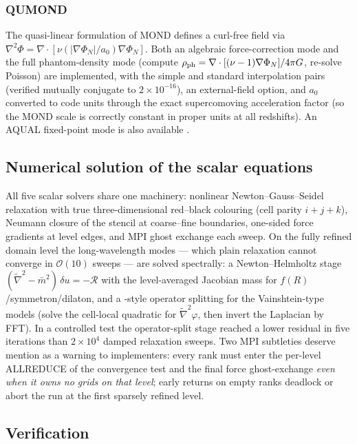 \documentclass[11pt,a4paper]{article}
\begin{document}
\subsubsection{QUMOND}
The quasi-linear formulation of MOND \citep{Milgrom2010} defines a
curl-free field via
$\nabla^2\Phi=\nabla\cdot[\nu(|\nabla\Phi_N|/a_0)\nabla\Phi_N]$.
Both an algebraic force-correction mode and the full
phantom-density mode (compute $\rho_{\rm ph}=\nabla\cdot[(\nu-1)
\nabla\Phi_N]/4\pi G$, re-solve Poisson) are implemented, with the
simple and standard interpolation pairs (verified mutually
conjugate to $2\times10^{-16}$), an external-field option, and
$a_0$ converted to code units through the exact supercomoving
acceleration factor (so the MOND scale is correctly constant in
proper units at all redshifts). An AQUAL fixed-point mode is also
available \citep[cf.][]{Lughausen2015,Candlish2015}.

\subsection{Numerical solution of the scalar equations}
\label{sec:solver}

All five scalar solvers share one machinery: nonlinear
Newton--Gauss--Seidel relaxation with true three-dimensional
red--black colouring (cell parity $i{+}j{+}k$), Neumann closure of
the stencil at coarse--fine boundaries, one-sided force gradients
at level edges, and MPI ghost exchange each sweep. On the fully
refined domain level the long-wavelength modes --- which plain
relaxation cannot converge in $\mathcal{O}(10)$ sweeps --- are
solved spectrally: a Newton--Helmholtz stage
$(\tilde\nabla^2-\bar m^2)\,\delta u=-\mathcal{R}$ with the
level-averaged Jacobian mass for $f(R)$/symmetron/dilaton, and a
\citet{Winther2015}-style operator splitting for the
Vainshtein-type models (solve the cell-local quadratic for
$\tilde\nabla^2\varphi$, then invert the Laplacian by FFT). In a
controlled test the operator-split stage reached a lower residual
in five iterations than $2\times10^4$ damped relaxation sweeps.
Two MPI subtleties deserve mention as a warning to implementers:
every rank must enter the per-level ALLREDUCE of the convergence
test and the final force ghost-exchange \emph{even when it owns no
grids on that level}; early returns on empty ranks deadlock or
abort the run at the first sparsely refined level.

\subsection{Verification}
\label{sec:verification}
\end{document}
